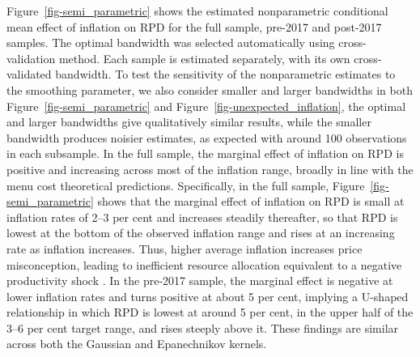 \documentclass[
  letterpaper,
  DIV=11,
  numbers=noendperiod]{scrartcl}
\begin{document}
Figure~\ref{fig-semi_parametric} shows the estimated nonparametric
conditional mean effect of inflation on RPD for the full sample,
pre-2017 and post-2017 samples. The optimal bandwidth was selected
automatically using cross-validation method. Each sample is estimated
separately, with its own cross-validated bandwidth. To test the
sensitivity of the nonparametric estimates to the smoothing parameter,
we also consider smaller and larger bandwidths in both
Figure~\ref{fig-semi_parametric} and
Figure~\ref{fig-unexpected_inflation}, the optimal and larger bandwidths
give qualitatively similar results, while the smaller bandwidth produces
noisier estimates, as expected with around 100 observations in each
subsample. In the full sample, the marginal effect of inflation on RPD
is positive and increasing across most of the inflation range, broadly
in line with the menu cost theoretical predictions. Specifically, in the
full sample, Figure~\ref{fig-semi_parametric} shows that the marginal
effect of inflation on RPD is small at inflation rates of 2--3 per cent
and increases steadily thereafter, so that RPD is lowest at the bottom
of the observed inflation range and rises at an increasing rate as
inflation increases. Thus, higher average inflation increases price
misconception, leading to inefficient resource allocation equivalent to
a negative productivity shock \citep{damjanovic2010}. In the pre-2017
sample, the marginal effect is negative at lower inflation rates and
turns positive at about 5 per cent, implying a U-shaped relationship in
which RPD is lowest at around 5 per cent, in the upper half of the 3--6
per cent target range, and rises steeply above it. These findings are
similar across both the Gaussian and Epanechnikov kernels.
\end{document}

